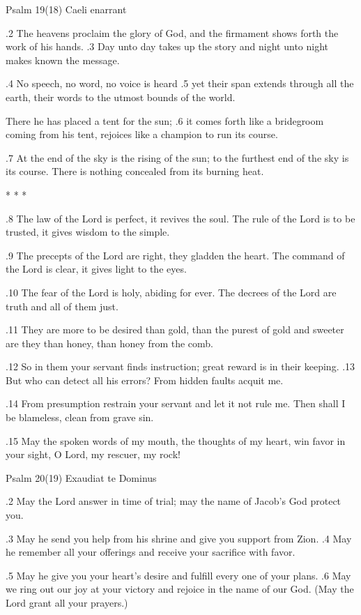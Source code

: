 Psalm 19(18) Caeli enarrant

.2 The heavens proclaim the glory of God,
and the firmament shows forth the work of his hands.
.3 Day unto day takes up the story
and night unto night makes known the message.

.4 No speech, no word, no voice is heard
.5 yet their span extends through all the earth,
their words to the utmost bounds of the world.

There he has placed a tent for the sun;
.6 it comes forth like a bridegroom coming from his tent,
rejoices like a champion to run its course.

.7 At the end of the sky is the rising of the sun;
to the furthest end of the sky is its course.
There is nothing concealed from its burning heat.

* * *

.8 The law of the Lord is perfect,
it revives the soul.
The rule of the Lord is to be trusted,
it gives wisdom to the simple.

.9 The precepts of the Lord are right,
they gladden the heart.
The command of the Lord is clear,
it gives light to the eyes.

.10 The fear of the Lord is holy,
abiding for ever.
The decrees of the Lord are truth
and all of them just.

.11 They are more to be desired than gold,
than the purest of gold
and sweeter are they than honey,
than honey from the comb.

.12 So in them your servant finds instruction;
great reward is in their keeping.
.13 But who can detect all his errors?
From hidden faults acquit me.

.14 From presumption restrain your servant
and let it not rule me.
Then shall I be blameless,
clean from grave sin.

.15 May the spoken words of my mouth,
the thoughts of my heart,
win favor in your sight, O Lord,
my rescuer, my rock!



Psalm 20(19) Exaudiat te Dominus

.2 May the Lord answer in time of trial;
may the name of Jacob's God protect you.

.3 May he send you help from his shrine
and give you support from Zion.
.4 May he remember all your offerings
and receive your sacrifice with favor.

.5 May he give you your heart's desire
and fulfill every one of your plans.
.6 May we ring out our joy at your victory
and rejoice in the name of our God.
(May the Lord grant all your prayers.)

